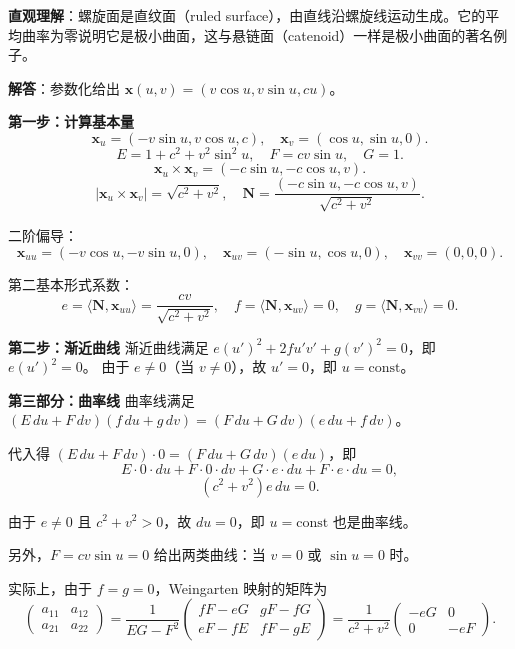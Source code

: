 \begin{solution}
\textbf{直观理解}：螺旋面是直纹面（ruled surface），由直线沿螺旋线运动生成。它的平均曲率为零说明它是极小曲面，这与悬链面（catenoid）一样是极小曲面的著名例子。

\textbf{解答}：参数化给出 $\mathbf{x}(u,v) = (v\cos u, v\sin u, cu)$。

\textbf{第一步：计算基本量}
\[
\mathbf{x}_u = (-v\sin u, v\cos u, c),\quad \mathbf{x}_v = (\cos u, \sin u, 0).
\]
\[
E = 1 + c^2 + v^2\sin^2 u,\quad F = cv\sin u,\quad G = 1.
\]
\[
\mathbf{x}_u \times \mathbf{x}_v = (-c\sin u, -c\cos u, v).
\]
\[
|\mathbf{x}_u \times \mathbf{x}_v| = \sqrt{c^2 + v^2},\quad \mathbf{N} = \frac{(-c\sin u, -c\cos u, v)}{\sqrt{c^2 + v^2}}.
\]

二阶偏导：
\[
\mathbf{x}_{uu} = (-v\cos u, -v\sin u, 0),\quad \mathbf{x}_{uv} = (-\sin u, \cos u, 0),\quad \mathbf{x}_{vv} = (0,0,0).
\]

第二基本形式系数：
\[
e = \langle \mathbf{N}, \mathbf{x}_{uu} \rangle = \frac{cv}{\sqrt{c^2+v^2}},\quad
f = \langle \mathbf{N}, \mathbf{x}_{uv} \rangle = 0,\quad
g = \langle \mathbf{N}, \mathbf{x}_{vv} \rangle = 0.
\]

\textbf{第二步：渐近曲线}
渐近曲线满足 $e(u')^2 + 2fu'v' + g(v')^2 = 0$，即 $e(u')^2 = 0$。
由于 $e \neq 0$（当 $v \neq 0$），故 $u' = 0$，即 $u = \mathrm{const}$。

\textbf{第三部分：曲率线}
曲率线满足 $(E\,du + F\,dv)(f\,du + g\,dv) = (F\,du + G\,dv)(e\,du + f\,dv)$。

代入得 $(E\,du + F\,dv) \cdot 0 = (F\,du + G\,dv)(e\,du)$，即
\[
E\cdot 0\cdot du + F\cdot 0\cdot dv + G\cdot e\cdot du + F\cdot e\cdot du = 0,
\]
\[
(c^2 + v^2)e\,du = 0.
\]

由于 $e \neq 0$ 且 $c^2 + v^2 > 0$，故 $du = 0$，即 $u = \mathrm{const}$ 也是曲率线。

另外，$F = cv\sin u = 0$ 给出两类曲线：当 $v = 0$ 或 $\sin u = 0$ 时。

实际上，由于 $f = g = 0$，Weingarten 映射的矩阵为
\[
\begin{pmatrix} a_{11} & a_{12} \\ a_{21} & a_{22} \end{pmatrix} = \frac{1}{EG-F^2}\begin{pmatrix} fF-eG & gF-fG \\ eF-fE & fF-gE \end{pmatrix} = \frac{1}{c^2+v^2}\begin{pmatrix} -eG & 0 \\ 0 & -eF \end{pmatrix}.
\]


\end{solution}
